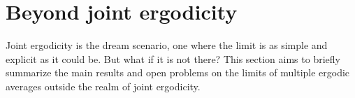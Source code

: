 \documentclass[11pt]{amsart}
\newtheorem{theorem}[lemma]{Theorem}
\newtheorem{problem}{Problem}
\theoremstyle{definition}
\DeclareMathOperator*{\E}{\mathbb{E}}
\newcommand{\N}{{\mathbb N}}
\newcommand{\Z}{{\mathbb Z}}
\newcommand{\CX}{{\mathcal X}}
\newcommand{\norm}[1]{\left\Vert #1\right\Vert}
\newcommand{\1}{{\mathbf{1}}}
\begin{document}
\section{Beyond joint ergodicity}\label{S: beyond joint ergodicity}
Joint ergodicity is the dream scenario, one where the limit is as simple and explicit as it could be. But what if it is not there? This section aims to briefly summarize the main results and open problems on the limits of multiple ergodic averages outside the realm of joint ergodicity.


\end{document}

